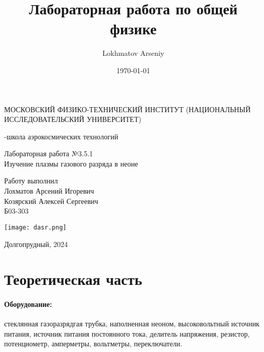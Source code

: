 \documentclass[a4paper,12pt]{article} %
\author{Lokhmatov Arseniy}
\title{Лабораторная работа по общей физике}
\date{\today}
\begin{document}
\begin{titlepage}
    \newpage
    \begin{center}
    {\large МОСКОВСКИЙ ФИЗИКО-ТЕХНИЧЕСКИЙ ИНСТИТУТ (НАЦИОНАЛЬНЫЙ ИССЛЕДОВАТЕЛЬСКИЙ УНИВЕРСИТЕТ)}
    \vspace{1cm}

    {-школа аэрокосмических технологий}
    \vspace{6em}
    \end{center}
    
    \vspace{1.2em}

    \begin{center}
    \Large Лабораторная работа №3.5.1 \\
    Изучение плазмы газового разряда в неоне
    \linebreak
    \end{center}
    
    \vspace{11em}
    
    \begin{flushright}
                       {\large Работу выполнил\\
                       Лохматов Арсений Игоревич\\
                       Козярский Алексей Сергеевич\\
                       Б03-303 }
    \end{flushright}

    \vspace{\fill}

    \begin{center}
        \texttt{[image: dasr.png]}
    \end{center}

    \begin{center}
    Долгопрудный, 2024
    \end{center}

    \end{titlepage}

\section{Теоретическая часть}

\paragraph{Оборудование:} стеклянная газоразрядгая трубка, наполненная неоном, высоковольтный источник питания, источник питания постоянного тока, делитель напряжения, резистор, потенциометр, амперметры, вольтметры, переключатели.
\end{document}
